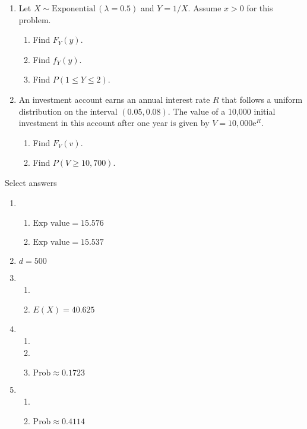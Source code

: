 \documentclass{article}
\newcommand{\follow}[1]{\sim \text{#1}\,}		%
\newcommand{\e}{\mathrm{e}}		%
\begin{document}
\begin{enumerate}
    \item Let $X \follow{Exponential}(\lambda = 0.5)$ and $Y = 1 / X$. Assume $x > 0$ for this problem.%
    \begin{enumerate}
        \item Find $F_Y(y)$.
        \item Find $f_Y(y)$.
        \item Find $P(1 \le Y \le 2)$.
    \end{enumerate}\bigskip
    
    \item An investment account earns an annual interest rate $R$ that follows a uniform distribution on the interval $(0.05, 0.08)$. The value of a 10,000 initial investment in this account after one year is given by $V = 10,000\e^R$.
    \begin{enumerate}
        \item Find $F_V(v)$.
        \item Find $P(V \ge 10,700)$.
    \end{enumerate}\bigskip
  
\end{enumerate}

\newpage

Select answers\bigskip
\begin{enumerate}
    \item 
    \begin{enumerate}
        \item $\text{Exp value} = 15.576$
        \item $\text{Exp value} = 15.537$
    \end{enumerate}
    
    \item $d = 500$
    
    \item 
    \begin{enumerate}
        \item 
        \item $E(X) = 40.625$
    \end{enumerate}
      
    \item
    \begin{enumerate}
        \item 
        \item 
        \item $\text{Prob} \approx 0.1723$
    \end{enumerate}
    
    \item 
    \begin{enumerate}
        \item 
        \item $\text{Prob} \approx 0.4114$
    \end{enumerate}
    
\end{enumerate}
    
\end{document}
